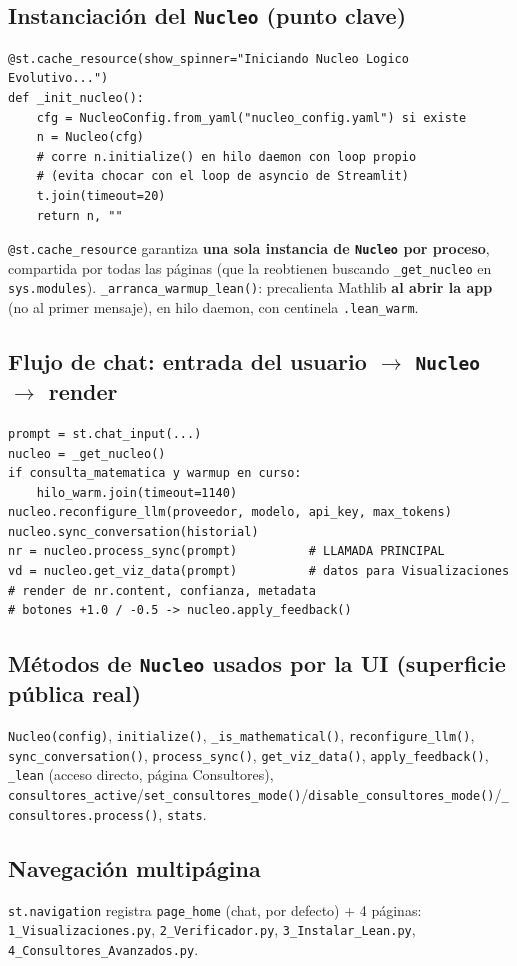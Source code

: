 \documentclass[11pt,a4paper]{report}
\newcommand{\code}[1]{\texttt{#1}}
\begin{document}
\subsection{Instanciaci\'on del \code{Nucleo} (punto clave)}
\begin{lstlisting}
@st.cache_resource(show_spinner="Iniciando Nucleo Logico Evolutivo...")
def _init_nucleo():
    cfg = NucleoConfig.from_yaml("nucleo_config.yaml") si existe
    n = Nucleo(cfg)
    # corre n.initialize() en hilo daemon con loop propio
    # (evita chocar con el loop de asyncio de Streamlit)
    t.join(timeout=20)
    return n, ""
\end{lstlisting}
\code{@st.cache_resource} garantiza \textbf{una sola instancia de \code{Nucleo} por proceso}, compartida por todas las p\'aginas (que la reobtienen buscando \code{\_get_nucleo} en \code{sys.modules}). \code{\_arranca_warmup_lean()}: precalienta Mathlib \textbf{al abrir la app} (no al primer mensaje), en hilo daemon, con centinela \code{.lean\_warm}.

\subsection{Flujo de chat: entrada del usuario $\to$ \code{Nucleo} $\to$ render}
\begin{lstlisting}
prompt = st.chat_input(...)
nucleo = _get_nucleo()
if consulta_matematica y warmup en curso:
    hilo_warm.join(timeout=1140)
nucleo.reconfigure_llm(proveedor, modelo, api_key, max_tokens)
nucleo.sync_conversation(historial)
nr = nucleo.process_sync(prompt)          # LLAMADA PRINCIPAL
vd = nucleo.get_viz_data(prompt)          # datos para Visualizaciones
# render de nr.content, confianza, metadata
# botones +1.0 / -0.5 -> nucleo.apply_feedback()
\end{lstlisting}

\subsection{M\'etodos de \code{Nucleo} usados por la UI (superficie p\'ublica real)}
\code{Nucleo(config)}, \code{initialize()}, \code{\_is_mathematical()}, \code{reconfigure_llm()}, \code{sync_conversation()}, \code{process_sync()}, \code{get_viz_data()}, \code{apply_feedback()}, \code{\_lean} (acceso directo, p\'agina Consultores), \code{consultores_active}/\code{set_consultores_mode()}/\code{disable_consultores_mode()}/\code{\_consultores.process()}, \code{stats}.

\subsection{Navegaci\'on multip\'agina}
\code{st.navigation} registra \code{page\_home} (chat, por defecto) + 4 p\'aginas: \code{1\_Visualizaciones.py}, \code{2\_Verificador.py}, \code{3\_Instalar\_Lean.py}, \code{4\_Consultores\_Avanzados.py}.
\end{document}
